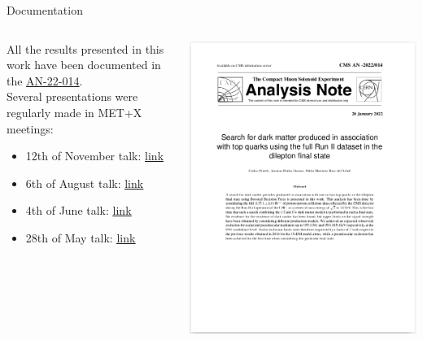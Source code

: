 \documentclass[8pt]{beamer}
\begin{document}
\begin{frame}{Documentation}
\justifying
\begin{columns}
	\begin{column}{0.5\textwidth}
All the results presented in this work have been documented in the \href{http://cms.cern.ch/iCMS/jsp/openfile.jsp?tp=draft&files=AN2022\_014\_v1.pdf}{\underline{AN-22-014}}. \\

\vspace{15pt}
Several presentations were regularly made in MET+X meetings:
\begin{itemize}
\item 12th of November talk: \href{https://indico.cern.ch/event/1096573/contributions/4613467/attachments/2344945/3998437/t_tt\%2BDM\%20analysis_\%20QCD\%20CR\%20Study.pdf}{\underline{link}}
\item 6th of August talk: \href{https://indico.cern.ch/event/1064763/contributions/4478350/attachments/2292242/3897404/tttDM_Run2_METX_Aug6.pdf}{\underline{link}}
\item 4th of June talk: \href{https://indico.cern.ch/event/1046021/contributions/4394503/attachments/2258424/3832675/040621_MET\%2BX_update.pdf}{\underline{link}}
\item 28th of May talk: \href{https://indico.cern.ch/event/1043390/contributions/4384078/attachments/2254021/3824239/t_ttDM_05282021.pdf}{\underline{link}}
\end{itemize}
	\end{column}
	\begin{column}{0.5\textwidth}
\includegraphics[width=1.0\textwidth]{figs/AN2.png}

\end{column}
\end{columns}
\end{frame}
\end{document}
